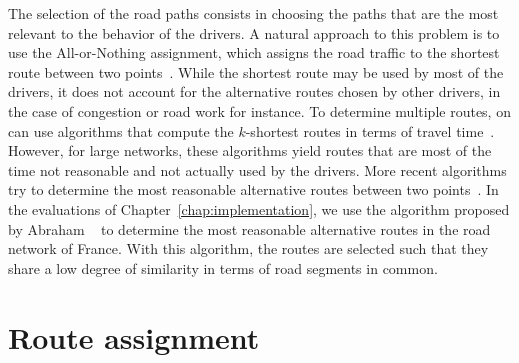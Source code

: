 The selection of the road paths consists in choosing the paths that are the most relevant to the behavior of the drivers. A natural approach to this problem is to use the All-or-Nothing assignment, which assigns the road traffic to the shortest route between two points~\cite{dijkstra1959note,delling2009engineering,hart1968formal}. While the shortest route may be used by most of the drivers, it does not account for the alternative routes chosen by other drivers, in the case of congestion or road work for instance. To determine multiple routes, on can use algorithms that compute the $k$-shortest routes in terms of travel time~\cite{yen1971finding,eppstein1998finding}. However, for large networks, these algorithms yield routes that are most of the time not reasonable and not actually used by the drivers. More recent algorithms try to determine the most reasonable alternative routes between two points~\cite{geisberger2010route,abraham2013alternative}. In the evaluations of Chapter~\ref{chap:implementation}, we use the algorithm proposed by Abraham \etal~\cite{abraham2013alternative} to determine the most reasonable alternative routes in the road network of France. With this algorithm, the routes are selected such that they share a low degree of similarity in terms of road segments in common. 

\section{Route assignment}
\label{sec:route-assignment}

